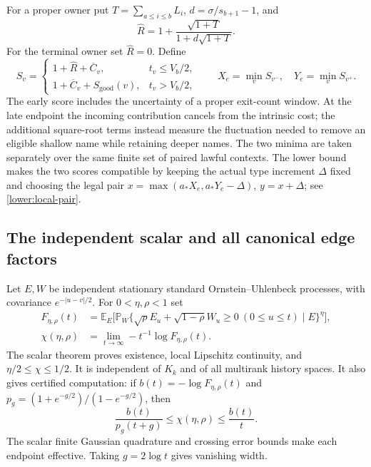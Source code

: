 For a proper owner put $T=\sum_{a\leq i\leq b}L_i$,
$d=\sigma/s_{b+1}-1$, and
\[
 \widehat R=1+\frac{\sqrt{1+T}}{1+d\sqrt{1+T}}.
\]
For the terminal owner set $\widehat R=0$. Define
\begin{equation}
 S_v=\begin{cases}
 1+\widehat R+\overline C_v,&t_v\leq V_b/2,\\
 1+\overline C_v+S_{\mathrm{good}}(v),&t_v>V_b/2,
 \end{cases}
 \qquad X_e=\min_v S_{v^-},\quad Y_e=\min_v S_{v^+}.
 \label{profile:scores}
\end{equation}
The early score includes the uncertainty of a proper exit-count window.
At the late endpoint the incoming contribution cancels from the intrinsic
cost; the additional square-root terms instead measure the fluctuation
needed to remove an eligible shallow name while retaining deeper names.
The two minima are taken separately over the same finite set of paired
lawful contexts. The lower bound makes the two scores compatible by
keeping the actual type increment $\Delta$ fixed and choosing the legal pair
$x=\max(a_*X_e,a_*Y_e-\Delta)$, $y=x+\Delta$; see
\eqref{lower:local-pair}.

\subsection{The independent scalar and all canonical edge factors}
Let $E,W$ be independent stationary standard Ornstein--Uhlenbeck
processes, with covariance $e^{-|u-v|/2}$. For $0<\eta,\rho<1$ set
\begin{align}
 F_{\eta,\rho}(t)&=
 \mathbb E_E\Big[\mathbb P_W\{
 \sqrt\rho E_u+\sqrt{1-\rho}W_u\geq0\ (0\leq u\leq t)
 \mid E\}^{\eta}\Big],\\
 \chi(\eta,\rho)&=\lim_{t\to\infty}-t^{-1}\log F_{\eta,\rho}(t).
 \label{profile:chi}
\end{align}
The scalar theorem proves existence, local Lipschitz continuity, and
$\eta/2\leq\chi\leq1/2$. It is independent of $K_k$ and of all
multirank history spaces. It also gives certified computation: if
$b(t)=-\log F_{\eta,\rho}(t)$ and
$p_g=(1+e^{-g/2})/(1-e^{-g/2})$, then
\begin{equation}
 \frac{b(t)}{p_g(t+g)}\leq\chi(\eta,\rho)\leq\frac{b(t)}t.
 \label{profile:chi-bracket}
\end{equation}
The scalar finite Gaussian quadrature and crossing error bounds make
each endpoint effective. Taking $g=2\log t$ gives vanishing width.

